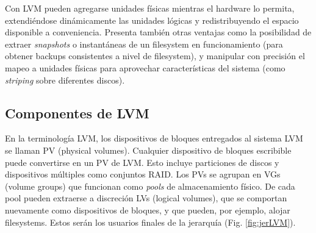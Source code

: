 Con LVM pueden agregarse unidades físicas mientras el hardware lo permita, extendiéndose dinámicamente las unidades lógicas y redistribuyendo el espacio disponible a conveniencia. Presenta también otras ventajas como la posibilidad de extraer \emph{snapshots} o instantáneas de un filesystem en funcionamiento (para obtener backups consistentes a nivel de filesystem), y manipular con precisión el mapeo a unidades físicas para aprovechar características del sistema (como \emph{striping} sobre diferentes discos).






\subsection{Componentes de LVM}
\label{sub:compLVM}
En la terminología LVM, los dispositivos de bloques entregados al sistema LVM se llaman PV (physical volumes). Cualquier dispositivo de bloques escribible puede convertirse en un PV de LVM. Esto incluye particiones de discos y dispositivos múltiples como conjuntos RAID. Los PVs se agrupan en VGs (volume groups) que funcionan como \emph{pools} de almacenamiento físico. De cada pool pueden extraerse a discreción LVs (logical volumes), que se comportan nuevamente como dispositivos de bloques, y que pueden, por ejemplo, alojar filesystems. Estos serán los usuarios finales de la jerarquía (Fig. \ref{fig:jerLVM}).








